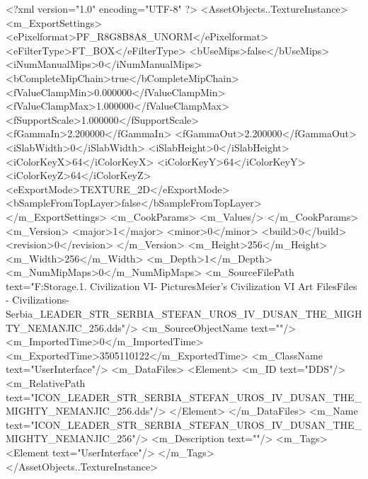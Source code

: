 <?xml version="1.0" encoding="UTF-8" ?>
<AssetObjects..TextureInstance>
	<m_ExportSettings>
		<ePixelformat>PF_R8G8B8A8_UNORM</ePixelformat>
		<eFilterType>FT_BOX</eFilterType>
		<bUseMips>false</bUseMips>
		<iNumManualMips>0</iNumManualMips>
		<bCompleteMipChain>true</bCompleteMipChain>
		<fValueClampMin>0.000000</fValueClampMin>
		<fValueClampMax>1.000000</fValueClampMax>
		<fSupportScale>1.000000</fSupportScale>
		<fGammaIn>2.200000</fGammaIn>
		<fGammaOut>2.200000</fGammaOut>
		<iSlabWidth>0</iSlabWidth>
		<iSlabHeight>0</iSlabHeight>
		<iColorKeyX>64</iColorKeyX>
		<iColorKeyY>64</iColorKeyY>
		<iColorKeyZ>64</iColorKeyZ>
		<eExportMode>TEXTURE_2D</eExportMode>
		<bSampleFromTopLayer>false</bSampleFromTopLayer>
	</m_ExportSettings>
	<m_CookParams>
		<m_Values/>
	</m_CookParams>
	<m_Version>
		<major>1</major>
		<minor>0</minor>
		<build>0</build>
		<revision>0</revision>
	</m_Version>
	<m_Height>256</m_Height>
	<m_Width>256</m_Width>
	<m_Depth>1</m_Depth>
	<m_NumMipMaps>0</m_NumMipMaps>
	<m_SourceFilePath text="F:\Mod Storage\2.1. Civilization VI\Mods\Archive - Pictures\Sid Meier's Civilization VI Art Files\Art Files - Civilizations\Civilization - Serbia\ICON_LEADER_STR_SERBIA_STEFAN_UROS_IV_DUSAN_THE_MIGHTY_NEMANJIC_256.dds"/>
	<m_SourceObjectName text=""/>
	<m_ImportedTime>0</m_ImportedTime>
	<m_ExportedTime>3505110122</m_ExportedTime>
	<m_ClassName text="UserInterface"/>
	<m_DataFiles>
		<Element>
			<m_ID text="DDS"/>
			<m_RelativePath text="ICON_LEADER_STR_SERBIA_STEFAN_UROS_IV_DUSAN_THE_MIGHTY_NEMANJIC_256.dds"/>
		</Element>
	</m_DataFiles>
	<m_Name text="ICON_LEADER_STR_SERBIA_STEFAN_UROS_IV_DUSAN_THE_MIGHTY_NEMANJIC_256"/>
	<m_Description text=""/>
	<m_Tags>
		<Element text="UserInterface"/>
	</m_Tags>
</AssetObjects..TextureInstance>

